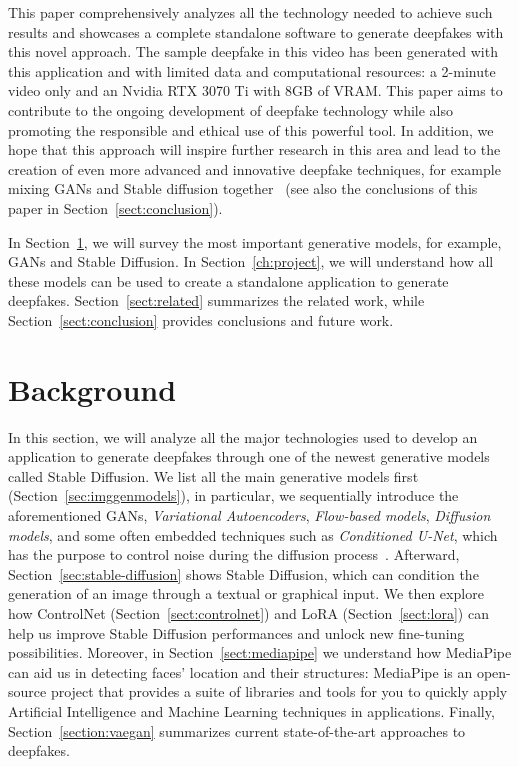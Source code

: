 \documentclass[preprint]{elsarticle}
\begin{document}
This paper comprehensively analyzes all the technology needed to achieve such results and showcases a complete standalone software to generate deepfakes with this novel approach. The sample deepfake in this video has been generated with this application and with limited data and computational resources: a 2-minute video only and an Nvidia RTX 3070 Ti with $8$GB of VRAM. This paper aims to contribute to the ongoing development of 
deepfake technology while also promoting the responsible and ethical use of this powerful tool.  In addition, we hope that this approach will inspire further research in this area and lead to the creation of even more advanced and innovative deepfake techniques, for example mixing GANs and Stable diffusion together~\cite{mix} (see also the conclusions of this paper in Section~\ref{sect:conclusion}).



In Section~\ref{sect:background}, we will survey the most important generative models, for example, GANs and Stable Diffusion.
In Section~\ref{ch:project}, we will understand how all these models can be used to create a standalone application to generate deepfakes. Section~\ref{sect:related} summarizes the related work, while Section~\ref{sect:conclusion} provides conclusions and future work.


\section{Background}\label{sect:background}


In this section, we will analyze all the major technologies used to develop an application to generate 
deepfakes through one of the newest generative models called Stable Diffusion. We list all the main generative models first (Section~\ref{sec:imggenmodels}), in particular, we sequentially introduce  the aforementioned GANs, \emph{Variational Autoencoders}, \emph{Flow-based models}, \emph{Diffusion models}, and some often embedded techniques such as \emph{Conditioned U-Net}, which has the purpose to control noise during the diffusion process~\cite{conditionedunet}.
Afterward, Section~\ref{sec:stable-diffusion} shows  Stable Diffusion, which can condition the 
generation of an image through a textual or graphical input.
We  then explore how ControlNet  (Section~\ref{sect:controlnet}) and LoRA (Section~\ref{sect:lora}) can help us improve Stable Diffusion performances and unlock new fine-tuning possibilities. 
Moreover, in Section~\ref{sect:mediapipe} we  understand how MediaPipe can aid us in detecting faces' location and their structures: MediaPipe  is an open-source project that provides a suite of libraries and tools for you to quickly apply Artificial Intelligence and Machine Learning techniques in  applications.
Finally, Section~\ref{section:vaegan}  summarizes current state-of-the-art approaches to deepfakes.
\end{document}
